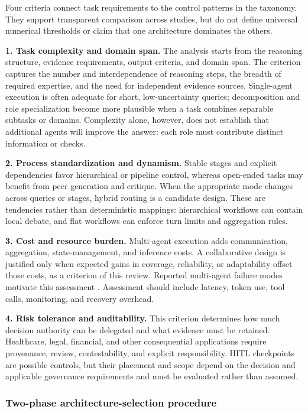 \documentclass[a4paper,fleqn]{cas-dc}
\begin{document}
Four criteria connect task requirements to the control patterns in the
taxonomy. They support transparent comparison across studies, but do not
define universal numerical thresholds or claim that one architecture
dominates the others.

\textbf{1. Task complexity and domain span.} The analysis starts from the
reasoning structure, evidence requirements, output criteria, and domain span.
The criterion captures the number and interdependence of reasoning steps, the
breadth of required expertise, and the need for independent evidence sources.
Single-agent execution is often adequate for short, low-uncertainty queries;
decomposition and role specialization become more plausible when a task
combines separable subtasks or domains. Complexity alone, however, does not
establish that additional agents will improve the answer: each role must
contribute distinct information or checks.

\textbf{2. Process standardization and dynamism.} Stable stages and explicit
dependencies favor hierarchical or pipeline control, whereas open-ended tasks
may benefit from peer generation and critique. When the appropriate mode
changes across queries or stages, hybrid routing is a candidate design. These
are tendencies rather than deterministic mappings: hierarchical workflows can
contain local debate, and flat workflows can enforce turn limits and
aggregation rules.

\textbf{3. Cost and resource burden.} Multi-agent execution adds
communication, aggregation, state-management, and inference costs. A
collaborative design is justified only when expected gains in coverage,
reliability, or adaptability offset those costs, as a criterion of this review.
Reported multi-agent failure modes motivate this assessment \citep{han2024mast}.
Assessment should include latency, token use, tool calls, monitoring, and recovery overhead.

\textbf{4. Risk tolerance and auditability.} This criterion determines how much
decision authority can be delegated and what evidence must be retained.
Healthcare, legal, financial, and other consequential applications require
provenance, review, contestability, and explicit responsibility. HITL
checkpoints are possible controls, but their placement and scope depend on the
decision and applicable governance requirements and must be evaluated rather
than assumed.

\subsubsection{Two-phase architecture-selection procedure}
\label{sec:two_phase}
\end{document}
